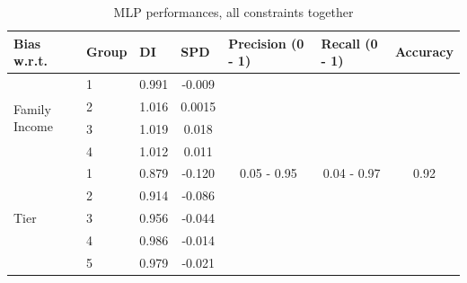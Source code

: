 \documentclass{article}
\begin{document}
\begin{table}[H]
\caption{MLP performances, all constraints together}
\label{tab:mlp-performances}
\begin{tabular}{llcc|ccc}
\hline
Bias w.r.t.                    & Group & \multicolumn{1}{l}{DI} & \multicolumn{1}{l}{SPD}    & \multicolumn{1}{l}{Precision (0 - 1)} & \multicolumn{1}{l}{Recall (0 - 1)} & \multicolumn{1}{l}{Accuracy} \\
\hline
\multirow{4}{*}{Family Income} & 1     & 0.991                  & -0.009                      & \multirow{13}{*}{0.05 - 0.95}         & \multirow{13}{*}{0.04 - 0.97}      & \multirow{13}{*}{0.92}       \\
                               			& 2     & 1.016                  & 0.0015                      &                                       &                                    &                              \\
                              			 & 3     & 1.019                  & 0.018                      &                                       &                                    &                              \\
                               			& 4     & 1.012                  & 0.011                      &                                       &                                    &                              \\
\cline{1-4}
\multirow{5}{*}{Tier}          & 1     & 0.879                  & -0.120                     &                                       &                                    &                              \\
                               		& 2     & 0.914                  & -0.086                     &                                       &                                    &                              \\
                              		 & 3     & 0.956                  & -0.044                      &                                       &                                    &                              \\
                            		   & 4     & 0.986                  & -0.014                      &                                       &                                    &                              \\
                           		    & 5     & 0.979                 & -0.021                      &                                       &                                    &                              \\

\end{tabular}
\end{table}
\end{document}
